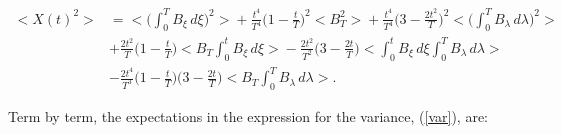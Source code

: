 \documentclass{article}
\numberwithin{equation}{section}
\begin{document}
\begin{equation}\label{var}
  \begin{aligned}
    \big<X(t)^2\big> &= \bigg< \bigg(\int_0^T B_{\xi}\,d\xi\bigg)^2\bigg> + \frac{t^4}{T^4}\bigg(1-\frac{t}{T}\bigg)^2\big<B_T^2\big> + \frac{t^4}{T^4}\bigg(3-\frac{2t^2}{T}\bigg)^2 \bigg<\bigg( \int_0^T B_{\lambda}\,d\lambda\bigg)^2\bigg>
    \\
    &+ \frac{2t^2}{T} \bigg(1-\frac{t}{T}\bigg) \bigg<B_T\int_0^t B_{\xi} \,d\xi\bigg> - \frac{2t^2}{T^2}\bigg( 3-\frac{2t}{T} \bigg) \bigg<\int_0^t B_{\xi}\,d\xi\int_0^T B_{\lambda}\,d\lambda \bigg>
    \\
    &- \frac{2t^4}{T^3} \bigg(1-\frac{t}{T}\bigg)\bigg(3-\frac{2t}{T}\bigg)\bigg<B_T\int_0^TB_{\lambda}\,d\lambda\bigg>.
  \end{aligned}
\end{equation}

Term by term, the expectations in the expression for the variance, (\ref{var}), are:
\end{document}

